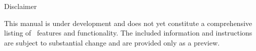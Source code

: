 \newpage

{\Huge 
\vspace*{0.5cm}
\noindent
Disclaimer
} \newline
\vspace*{0.25cm}

\noindent
{\large
This manual is under development and does not yet constitute a comprehensive listing of
\BornAgain\ features and functionality. 
The included information and instructions are subject to substantial change and
are provided only as a preview.
}
